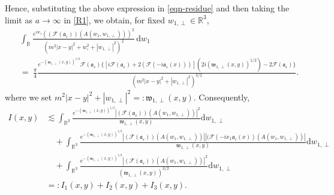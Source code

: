 \documentclass{article}
\newcommand{\backassign}{=:}
\newcommand{\mathd}{\mathrm{d}}
\newcommand{\nobracket}{}
\begin{document}
%
Hence, substituting the above expression in \eqref{eqn-residue} and then taking the limit as $a
\rightarrow \infty $ in \eqref{R1}, we obtain, for fixed $w_{1, \perp} \in\mathbb{R}^3$,
%
\begin{align}
    & \int_{\mathbb{R}} \frac{e^{i w_1} ((\mathcal{F}
    (\mathfrak{a}_{\varepsilon})) (A (w_1, w_{1, \perp})))^2}{(m^2 | x - y |^2
    + w_{^1}^2 + | w_{1, \perp} |^2)^2} \, \mathd w_1 \nonumber\\
    & = ~ \frac{\pi}{4} \frac{e^{- (\mathfrak{w}_{1, \perp} (x, y))^{1 / 2}}
    \mathcal{F} (\mathfrak{a}_{\varepsilon}) \{ [i\mathcal{F}
    (\mathfrak{a}_{\varepsilon}) + 2 (\mathcal{F} (-
    i\mathfrak{a}_{\varepsilon} (x)))] (2 i (\mathfrak{w}_{1, \perp} (x,
    y))^{1 / 2}) - 2\mathcal{F} (\mathfrak{a}_{\varepsilon}) \}}{{(m^2 | x - y
    |^2 + | w_{1, \perp} |^2)^{3 / 2}} } .
  \label{I4}
\end{align}
%
where we set  $m^2 | x - y |^2 + | w_{1, \perp} |^2 \backassign \mathfrak{w}_{1, \perp} (x, y) .$ 
%
Consequently,
\begin{align}
    I (x, y) & \lesssim \int_{\mathbb{R}^3} \frac{e^{- (\mathfrak{w}_{1, \perp} (x,
    y))^{1 / 2}} | (\mathcal{F} (\mathfrak{a}_{\varepsilon})) (A (w_1, w_{1,
    \perp})) |^2}{\mathfrak{w}_{1, \perp} (x, y)} \mathd w_{1, \perp} \nonumber \\
    & \quad + \int_{\mathbb{R}^3} \frac{e^{- (\mathfrak{w}_{1, \perp} (x, y))^{1 /
    2}} | (\mathcal{F} (\mathfrak{a}_{\varepsilon})) (A (w_1, w_{1, \perp})) |
    | (\mathcal{F} (- i x_1 \mathfrak{a}_{\varepsilon} (x) \nobracket) (A
    (w_1, w_{1, \perp})) |}{\mathfrak{w}_{1, \perp} (x, y)} \mathd w_{1,
    \perp} \nonumber \\
    & \quad + \int_{\mathbb{R}^3} \frac{e^{- (\mathfrak{w}_{1, \perp} (x, y))^{1 /
    2}} | (\mathcal{F} (\mathfrak{a}_{\varepsilon})) (A (w_1, w_{1, \perp}))
    |^2}{{(\mathfrak{w}_{1, \perp} (x, y))^{3 / 2}} } \mathd w_{1, \perp} \nonumber \\
    &  \backassign I_1 (x, y) + I_2 (x, y) + I_3 (x, y) .
  \label{I5}
\end{align}
\end{document}
